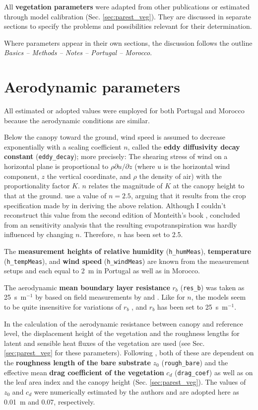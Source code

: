 \documentclass{scrreprt}
\begin{document}
All \textbf{vegetation parameters} were adapted from other publications or estimated through model calibration (Sec. \ref{sec:parest_veg}).
They are discussed in separate sections to specify the problems and possibilities relevant for their determination.

Where parameters appear in their own sections, the discussion follows the outline \emph{Basics -- Methods -- Notes -- Portugal -- Morocco}.

\section{Aerodynamic parameters} \label{sec:parest_aero}

All estimated or adopted values were employed for both Portugal and Morocco because the aerodynamic conditions are similar.

Below the canopy toward the ground, wind speed is assumed to decrease exponentially with a scaling coefficient $n$, called the \textbf{eddy diffusivity decay constant} (\verb!eddy_decay!); more precisely:
The shearing stress of wind on a horizontal plane is proportional to $\rho \partial u / \partial z$ (where $u$ is the horizontal wind component, $z$ the vertical coordinate, and $\rho$ the density of air) with the proportionality factor $K$.
$n$ relates the magnitude of $K$ at the canopy height to that at the ground.
\citet{shuttleworth85} use a value of $n = 2.5$, arguing that it results from the crop specification made by \citet{monteith73} in deriving the above relation.
Although I couldn't reconstruct this value from the second edition of Monteith's book \citep{monteith90}, \citet{shuttleworth85} concluded from an sensitivity analysis that the resulting evapotranspiration was hardly influenced by changing $n$.
Therefore, $n$ has been set to 2.5.

The \textbf{measurement heights of relative humidity} (\verb!h_humMeas!), \textbf{temperature} (\verb!h_tempMeas!), and \textbf{wind speed} (\verb!h_windMeas!) are known from the measurement setups and each equal to 2~m in Portugal as well as in Morocco.

The aerodynamic \textbf{mean boundary layer resistance} $r_b$ (\verb!res_b!) was taken as 25~s~m$^{-1}$ by \citet{shuttleworth85} based on field measurements by \citet{denmead76} and \citet{uchijima76}.
Like for $n$, the models seem to be quite insensitive for variations of $r_b$ \citep{shuttleworth85}, and $r_b$ has been set to 25~s~m$^{-1}$.

In the calculation of the aerodynamic resistance between canopy and reference level, the displacement height of the vegetation and the roughness lengths for latent and sensible heat fluxes of the vegetation are used (see Sec. \ref{sec:parest_veg} for these parameters).
Following \citet{shuttleworth90}, both of these are dependent on the \textbf{roughness length of the bare substrate} $z_0$ (\verb!rough_bare!) and the effective mean \textbf{drag coefficient of the vegetation} $c_d$ (\verb!drag_coef!) as well as on the leaf area index and the canopy height (Sec. \ref{sec:parest_veg}).
The values of $z_0$ and $c_d$ were numerically estimated by the authors and are adopted here as 0.01~m and 0.07, respectively.
\end{document}
